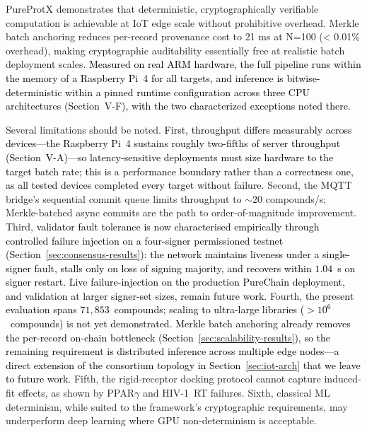 \documentclass[conference]{IEEEtran}
\begin{document}
PureProtX demonstrates that deterministic, cryptographically verifiable
computation is achievable at IoT edge scale without prohibitive overhead.
Merkle batch anchoring reduces per-record provenance cost to 21 ms at
N=100 (< 0.01\% overhead), making cryptographic auditability essentially
free at realistic batch deployment scales. \textcolor{black}{Measured on real
ARM hardware, the full pipeline runs within the memory of a Raspberry Pi~4
for all targets, and inference is bitwise-deterministic within a pinned
runtime configuration across three CPU architectures (Section~V-F), with the
two characterized exceptions noted there.}

Several limitations should be noted. \textcolor{black}{First, throughput
differs measurably across devices---the Raspberry Pi~4 sustains roughly
two-fifths of server throughput (Section~V-A)---so latency-sensitive
deployments must size hardware to the target batch rate; this is a
performance boundary rather than a correctness one, as all tested devices
completed every target without failure.} Second, the MQTT bridge's
sequential commit queue limits throughput to $\sim$20 compounds/s;
Merkle-batched async commits are the path to order-of-magnitude improvement.
Third, \textcolor{black}{validator fault tolerance is now characterised
empirically through controlled failure injection on a
four-signer permissioned testnet
(Section~\ref{sec:consensus-results}): the network
maintains liveness under a single-signer fault, stalls
only on loss of signing majority, and recovers within
$1.04$~s on signer restart. Live failure-injection on the
production PureChain deployment, and validation at larger
signer-set sizes, remain future work.}
Fourth, \textcolor{black}{the present evaluation spans $71{,}853$~compounds;
scaling to ultra-large libraries ($>10^6$~compounds) is
not yet demonstrated. Merkle batch anchoring already
removes the per-record on-chain bottleneck
(Section~\ref{sec:scalability-results}), so the remaining
requirement is distributed inference across multiple edge
nodes---a direct extension of the consortium topology in
Section~\ref{sec:iot-arch} that we leave to future work.}
Fifth, the rigid-receptor docking protocol cannot
capture induced-fit effects, as shown by PPAR$\gamma$
and HIV-1~RT failures.
Sixth, classical ML determinism, while suited to the
framework's cryptographic requirements, may underperform
deep learning where GPU non-determinism is acceptable.


 
\end{document}

